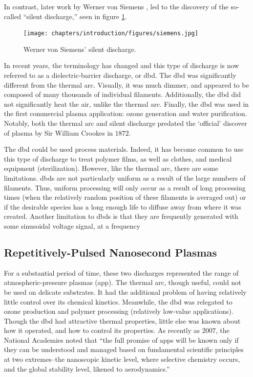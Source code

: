 In contrast, later work by Werner von Siemens \cite{Siemens1857}, led to the
discovery of the so-called ``silent discharge,'' seen in figure
\ref{fig:siemens}.
\begin{figure}\label{fig:siemens}
  \centering
  \texttt{[image: chapters/introduction/figures/siemens.jpg]}
  \caption{Werner von Siemens' silent discharge.}
\end{figure}
In recent years, the terminology has changed and this type of
discharge is now referred to as a dielectric-barrier discharge, or \acs{dbd}.
The \acs{dbd} was significantly different from the thermal arc. Visually, it was
much dimmer, and appeared to be composed of many thousands of individual
filaments. Additionally, the \acs{dbd} did not significantly heat the air,
unlike the thermal arc. Finally, the \acs{dbd} was used in the first commercial
plasma application: ozone generation and water purification. Notably, both the
thermal arc and silent discharge predated the `official' discover of plasma by
Sir William Crookes in $1872$.

The \acs{dbd} could be used process materials. Indeed, it has become common to
use this type of discharge to treat polymer films, as well as clothes, and
medical equipment (sterilization). However, like the thermal arc, there are some
limitations. \acs{dbd}s are not particularly uniform as a result of the large
numbers of filaments. Thus, uniform processing will only occur as a result of
long processing times (when the relatively random position of these filaments is
averaged out) or if the desirable species has a long enough life to diffuse away
from where it was created. Another limitation to \acs{dbd}s is that they are
frequently generated with some sinusoidal voltage signal, at a frequency

\subsection{Repetitively-Pulsed Nanosecond Plasmas}

For a substantial period of time, these two  discharges
represented the range of atmospheric-pressure plasmas (\acs{app}). The thermal
arc, though useful, could not be used on delicate substrates. It had the
additional problem of having relatively little control over its chemical
kinetics. Meanwhile, the \acs{dbd} was relegated to ozone production and polymer
processing (relatively low-value applications). Though the \acs{dbd} had
attractive thermal properties, little else was known about how it operated, and
how to control its properties. As recently as $2007$, the National Academies
noted that ``the full promise of \acs{app}s will be known only if they can be
understood and managed based on fundamental scientific principles at two
extremes--the nanoscopic kinetic level, where selective chemistry occurs, and
the global stability level, likened to aerodynamics.''

